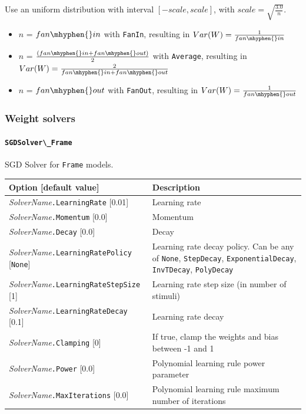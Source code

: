 \documentclass[a4paper,11pt,oneside]{article}
\newenvironment{myitemize}
{ \begin{itemize}
    \setlength{\itemsep}{0pt}
    \setlength{\parskip}{0pt}
    \setlength{\parsep}{0pt}     }
{ \end{itemize}                  }
\begin{document}
Use an uniform distribution with interval $[-scale,scale]$, with $scale = \sqrt{\frac{3.0}{n}}$.

\begin{myitemize}
\item $n$ = $fan\mhyphen{}in$ with \lstinline!FanIn!, resulting in
$Var(W)=\frac{1}{fan\mhyphen{}in}$ \\
\item $n$ = $\frac{(fan\mhyphen{}in + fan\mhyphen{}out)}{2}$ with
\lstinline!Average!, resulting in
$Var(W)=\frac{2}{fan\mhyphen{}in + fan\mhyphen{}out}$ \\
\item $n$ = $fan\mhyphen{}out$ with \lstinline!FanOut!, resulting in
$Var(W)=\frac{1}{fan\mhyphen{}out}$
\end{myitemize}


\subsubsection{\label{sec:WeightSolvers}Weight solvers}

\paragraph{\texorpdfstring{%
\lstinline[basicstyle=\ttfamily\bfseries]!SGDSolver\_Frame!}{SGDSolver\_Frame}}
SGD Solver for \lstinline!Frame! models.

\begin{center}
 \begin{tabular}{| p{5cm} | p{10cm} | }
 \hline
 Option [default value] & Description\\
 \hline\hline
   \emph{SolverName}\lstinline!.LearningRate! [0.01] & Learning rate \\
   \emph{SolverName}\lstinline!.Momentum! [0.0] & Momentum \\
   \emph{SolverName}\lstinline!.Decay! [0.0] & Decay \\
   \emph{SolverName}\lstinline!.LearningRatePolicy! [\lstinline!None!]
   & Learning rate decay policy. Can be any of \lstinline!None!,
   \lstinline!StepDecay!, \lstinline!ExponentialDecay!, \lstinline!InvTDecay!,
    \lstinline!PolyDecay! \\
   \emph{SolverName}\lstinline!.LearningRateStepSize! [1] & Learning rate
    step size (in number of stimuli) \\
   \emph{SolverName}\lstinline!.LearningRateDecay! [0.1] & Learning rate
    decay \\
   \emph{SolverName}\lstinline!.Clamping! [0] & If true, clamp the weights and
   bias between -1 and 1 \\
   \emph{SolverName}\lstinline!.Power! [0.0] & Polynomial learning rule power
    parameter \\
   \emph{SolverName}\lstinline!.MaxIterations! [0.0] & Polynomial learning
   rule maximum number of iterations \\

 \hline
\end{tabular}
\end{center}
\end{document}
